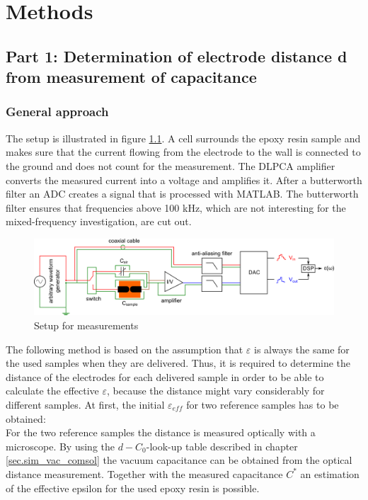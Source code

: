 \chapter{Methods}
\section{Part 1: Determination of electrode distance d from measurement of capacitance}
\label{part1}
\subsection{General approach}
The setup is illustrated in figure \ref{sec.setup_amp_1}. A cell surrounds the  epoxy resin sample and makes sure that the current flowing from the electrode to the wall is connected to the ground and does not count for the measurement. The DLPCA amplifier converts the measured current into a voltage and amplifies it. After a butterworth filter an ADC creates a signal that is processed with MATLAB. The butterworth filter ensures that frequencies above 100 kHz, which are not interesting for the mixed-frequency investigation, are cut out. 

\begin{figure}[htbp]
	\centering
	\includegraphics[width=\textwidth]{figures/Method/setup/setup_amplifier.png}		
	\caption[Kurze Abbildungsbeschreibung]{Setup for measurements\protect\footnotemark} 
	\label{sec.setup_amp_1}

\end{figure}

\label{sec:general_approach}
The following method is based on the assumption that  $\varepsilon$ is always the same for the used samples when they are delivered. Thus, it is required to determine the distance of the electrodes for each delivered sample in order to be able to calculate the effective $\varepsilon$, because the distance might vary considerably for different samples. 
At first, the initial $\varepsilon_{eff}$ for two reference samples has to be obtained:\\
For the two reference samples the distance is measured optically with a microscope. By using the $d-C_0$-look-up table described in  chapter \ref{sec.sim_vac_comsol} the vacuum capacitance can be obtained from the optical distance measurement. Together with the measured capacitance $C^*$ an estimation of the effective epsilon for the used epoxy resin is possible. 

